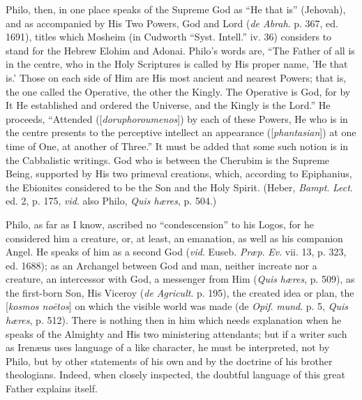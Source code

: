 Philo, then, in one place speaks of the Supreme God as ``He
that is'' (Jehovah), and as accompanied by His Two Powers, God and
Lord (\emph{de Abrah}. p. 367, ed. 1691), titles which Mosheim (in
Cudworth ``Syst. Intell.'' iv. 36) considers to stand for the
Hebrew Elohim and Adonai. Philo's words are, ``The Father of all
is in the centre, who in the Holy Scriptures is called by His proper
name, 'He that is.' Those on each side of Him are His most ancient and
nearest Powers; that is, the one called the Operative, the other the
Kingly. The Operative is God, for by It He established and ordered the
Universe, and the Kingly is the Lord.'' He proceeds,
``Attended ([\emph{doruphoroumenos}]) by each of these Powers, He
who is in the centre presents to the perceptive intellect an
appearance ([\emph{phantasian}]) at one time of One, at another of
Three.'' It must be added that some such notion is in the
Cabbalistic writings. God who is between the Cherubim is the Supreme
Being, supported by His two primeval creations, which, according to
Epiphanius, the Ebionites considered to be the Son and the Holy
Spirit. (Heber, \emph{Bampt}. \emph{Lect}. ed. 2, p. 175, \emph{vid}.
also Philo, \emph{Quis hæres}, p. 504.)

Philo, as far as I know, ascribed no ``condescension'' to
his Logos, for he considered him a creature, or, at least, an
emanation, as well as his companion Angel. He speaks of him as a
second God (\emph{vid}. Euseb. \emph{Præp}. \emph{Ev}. vii. 13, p.
323, ed. 1688); as an Archangel between God and man, neither increate
nor a creature, an intercessor with God, a messenger from Him (\emph{Quis}
\emph{hæres}, p. 509), as the first-born Son, His Viceroy (\emph{de
Agricult}. p. 195), the created idea or plan, the [\emph{kosmos no\={e}tos}]
on which the visible world was made (de \emph{Opif}. \emph{mund}. p.
5, \emph{Quis} \emph{hæres}, p. 512). There is nothing then in him
which needs explanation when he speaks of the Almighty and His two
ministering attendants; but if a writer such as Irenæus uses language
of a like character, he must be interpreted, not by Philo, but by
other statements of his own and by the doctrine of his brother
theologians. Indeed, when closely inspected, the doubtful language of
this great Father explains itself.

